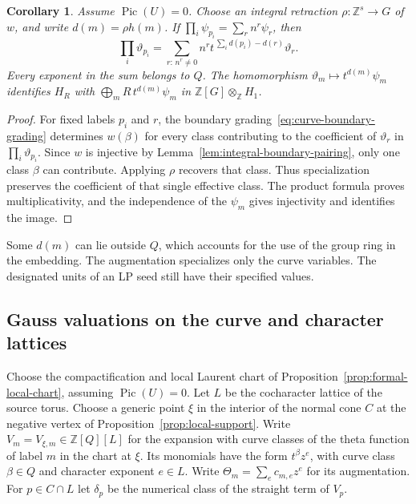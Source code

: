 \documentclass[11pt,reqno]{amsart}
\numberwithin{equation}{section}
\newtheorem{corollary}[theorem]{Corollary}
\theoremstyle{definition}
\theoremstyle{remark}
\DeclareMathOperator{\Pic}{Pic}
\begin{document}
\begin{corollary}\label{cor:full-integral-coefficient-gauge}
Assume \(\Pic(U)=0\). Choose an integral retraction
\(\rho:\mathbb Z^s\to G\) of \(w\), and write \(d(m)=\rho h(m)\).
If \(\prod_i\psi_{p_i}=\sum_r n^r\psi_r\), then
\[ \prod_i\vartheta_{p_i}=\sum_{r:\,n^r\ne0} n^r t^{\,\sum_i d(p_i)-d(r)}\vartheta_r . \]
Every exponent in the sum belongs to \(Q\).
The homomorphism \(\vartheta_m\mapsto t^{d(m)}\psi_m\) identifies
\(H_R\) with \(\bigoplus_m R\,t^{d(m)}\psi_m\) in
\(\mathbb Z[G]\otimes_{\mathbb Z}H_1\).
\end{corollary}
\begin{proof}
For fixed labels \(p_i\) and \(r\), the boundary grading~\eqref{eq:curve-boundary-grading} determines
\(w(\beta)\) for every class contributing to the coefficient of
\(\vartheta_r\) in \(\prod_i\vartheta_{p_i}\). Since \(w\) is injective by
Lemma~\ref{lem:integral-boundary-pairing}, only one class \(\beta\)
can contribute. Applying \(\rho\) recovers that class. Thus specialization preserves the coefficient of
that single effective class. The product formula proves
multiplicativity, and the independence of the \(\psi_m\) gives
injectivity and identifies the image.
\end{proof}

Some \(d(m)\) can lie outside \(Q\), which accounts for the use of
the group ring in the embedding. The augmentation specializes only
the curve variables. The designated units of an LP seed still have
their specified values.

\subsection{Gauss valuations on the curve and character lattices}

Choose the compactification and local Laurent chart of
Proposition~\ref{prop:formal-local-chart}, assuming \(\Pic(U)=0\).
Let \(L\) be the cocharacter lattice of the source torus. Choose a
generic point \(\xi\) in the interior of the normal cone \(C\) at the
negative vertex of Proposition~\ref{prop:local-support}.
Write \(V_m=V_{\xi,m}\in\mathbb Z[Q][L]\) for the expansion with
curve classes of the theta function of label \(m\) in the chart at
\(\xi\). Its monomials have the form \(t^\beta z^e\), with curve class
\(\beta\in Q\) and character exponent \(e\in L\). Write
\(\Theta_m=\sum_e c_{m,e}z^e\) for its augmentation.
For \(p\in C\cap L\) let \(\delta_p\) be the numerical class of
the straight term of \(V_p\).
\end{document}
